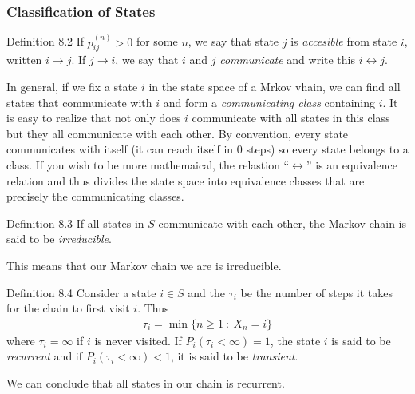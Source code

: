 \subsubsection{Classification of States}
\begin{boks}{Definition 8.2}
  If $p_{ij}^{(n)} > 0$ for some $n$, we say that state $j$ is \textit{accesible} from state $i$, written $i \rightarrow j$. If $j \rightarrow i$, we say that $i$ and $j$ \textit{communicate} and write this $i \leftrightarrow j$.
\end{boks}
In general, if we fix a state $i$ in the state space of a Mrkov vhain, we can find all states that communicate with $i$ and form a \textit{communicating class} containing $i$. It is easy to realize that not only does $i$ communicate with all states in this class but they all communicate with each other. By convention, every state communicates with itself (it can reach itself in $0$ steps) so every state belongs to a class.
If you wish to be more mathemaical, the relastion ``$\leftrightarrow$'' is an equivalence relation and thus divides the state space into equivalence classes that are precisely the communicating classes.
\begin{boks}{Definition 8.3}
  If all states in $S$ communicate with each other, the Markov chain is said to be \textit{irreducible}.
\end{boks}
This means that our Markov chain we are is irreducible.
\begin{boks}{Definition 8.4}
  Consider a state $i \in S$ and the $\tau_i$ be the number of steps it takes for the chain to first visit $i$. Thus
  \begin{align*}
    \tau_i = \min \{ n \geq 1 \ : \ X_n = i \}
  \end{align*}
  where $\tau_i = \infty$ if $i$ is never visited. If $P_i(\tau_i < \infty) = 1$, the state $i$ is said to be \textit{recurrent} and if $P_i(\tau_i < \infty) < 1$, it is said to be \textit{transient}.
\end{boks}
We can conclude that all states in our chain is recurrent.


